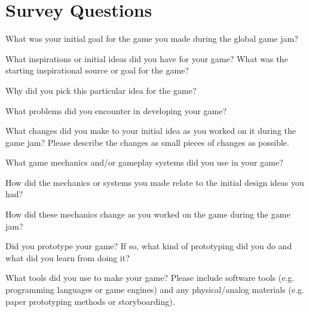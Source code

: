 \documentclass{sig-alternate}
\begin{document}
\section{Survey Questions}
\label{sec:survey}
\begin{list}{}{\leftmargin=10pt \itemindent=0em \itemsep=0pt}
\item What was your initial goal for the game you made during the global game jam?
\item What inspirations or initial ideas did you have for your game? What was the starting inspirational source or goal for the game?
\item Why did you pick this particular idea for the game?
\item What problems did you encounter in developing your game?
\item What changes did you make to your initial idea as you worked on it during the game jam? Please describe the changes as small pieces of changes as possible.
\item What game mechanics and/or gameplay systems did you use in your game?
\item How did the mechanics or systems you made relate to the initial design ideas you had?
\item How did these mechanics change as you worked on the game during the game jam?
\item Did you prototype your game? If so, what kind of prototyping did you do and what did you learn from doing it?
\item What tools did you use to make your game? Please include software tools (e.g. programming languages or game engines) and any physical/analog materials (e.g. paper prototyping methods or storyboarding).
\end{list}
\end{document}
